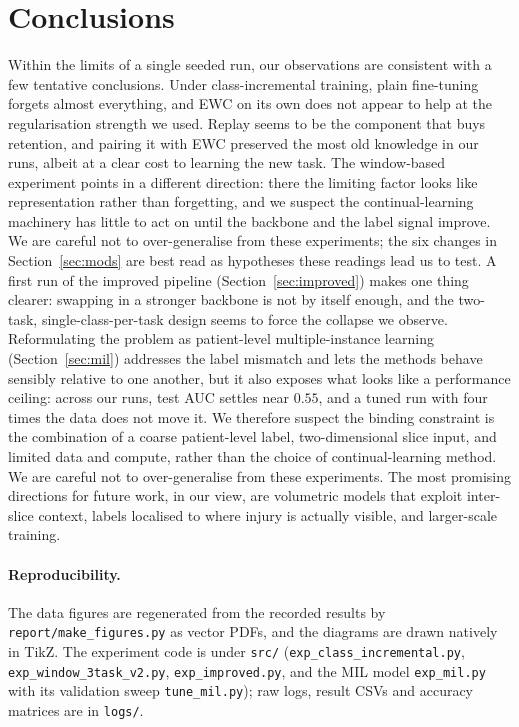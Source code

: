 \documentclass[11pt]{article}
\begin{document}
\section{Conclusions}
Within the limits of a single seeded run, our observations are consistent with a
few tentative conclusions. Under class-incremental training, plain fine-tuning
forgets almost everything, and EWC on its own does not appear to help at the
regularisation strength we used. Replay seems to be the component that buys
retention, and pairing it with EWC preserved the most old knowledge in our runs,
albeit at a clear cost to learning the new task. The window-based experiment
points in a different direction: there the limiting factor looks like
representation rather than forgetting, and we suspect the continual-learning
machinery has little to act on until the backbone and the label signal improve.
We are careful not to over-generalise from these experiments; the six changes in
Section~\ref{sec:mods} are best read as hypotheses these readings lead us to test.
A first run of the improved pipeline (Section~\ref{sec:improved}) makes one thing
clearer: swapping in a stronger backbone is not by itself enough, and the
two-task, single-class-per-task design seems to force the collapse we observe.
Reformulating the problem as patient-level multiple-instance learning
(Section~\ref{sec:mil}) addresses the label mismatch and lets the methods behave
sensibly relative to one another, but it also exposes what looks like a
performance ceiling: across our runs, test AUC settles near $0.55$, and a tuned
run with four times the data does not move it. We therefore suspect the binding
constraint is the combination of a coarse patient-level label, two-dimensional
slice input, and limited data and compute, rather than the choice of
continual-learning method. We are careful not to over-generalise from these
experiments. The most promising directions for future work, in our view, are
volumetric models that exploit inter-slice context, labels localised to where
injury is actually visible, and larger-scale training.

\paragraph{Reproducibility.} The data figures are regenerated from the recorded
results by \texttt{report/make\_figures.py} as vector PDFs, and the diagrams are
drawn natively in TikZ. The experiment code is under \texttt{src/}
(\texttt{exp\_class\_incremental.py}, \texttt{exp\_window\_3task\_v2.py},
\texttt{exp\_improved.py}, and the MIL model \texttt{exp\_mil.py} with its
validation sweep \texttt{tune\_mil.py}); raw logs, result CSVs and accuracy
matrices are in \texttt{logs/}.
\end{document}
